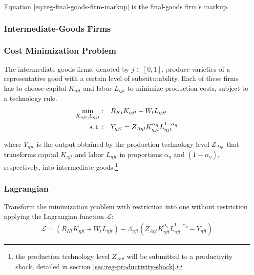 \documentclass[../thesis.tex]{subfiles}
\begin{document}
Equation \ref{eq:reg-final-goods-firm-markup} is the final-goods firm's markup.


\subsubsection{Intermediate-Goods Firms}

\subsubsection*{Cost Minimization Problem}

The intermediate-goods firms, denoted by $j \in [0,1]$, produce varieties of a representative good with a certain level of substitutability. Each of these firms has to choose capital $K_{\eta jt}$ and labor $L_{\eta jt}$ to minimize production costs, subject to a technology rule.
\begin{align}
	\label{eq:reg-int-good-firm-total-cost}
	\min_{K_{\eta jt}, L_{\eta jt}}: \quad & R_{Kt} K_{\eta jt} + W_t L_{\eta jt} \\
	\label{eq:reg-int-good-firm-production-function}
	\operatorname{s.t.}: \quad & Y_{\eta jt} = Z_{A\eta t} K_{\eta jt}^{\alpha_{\eta}} L_{\eta jt}^{1-{\alpha_{\eta}}}
\end{align}

where $Y_{\eta jt}$ is the output obtained by the production technology level $Z_{A\eta t}$ that transforms capital $K_{\eta jt}$ and labor $L_{\eta jt}$ in proportions ${\alpha_{\eta}}$ and $(1-{\alpha_{\eta}})$, respectively, into intermediate goods.\footnote{the production technology level $Z_{A\eta t}$ will be submitted to a productivity shock, detailed in section \ref{sec:reg-productivity-shock}.}

\subsubsection*{Lagrangian}

Transform the minimization problem with restriction into one without restriction applying the Lagrangian function $\mathcal{L}$:
\begin{align}
	\label{eq:reg-int-good-firm-lagrangian}
	\mathcal{L} = (R_{Kt} K_{\eta jt} + W_t L_{\eta jt}) - \Lambda_{\eta jt} (Z_{A\eta t} K_{\eta jt}^{\alpha_{\eta}} L_{\eta jt}^{1-{\alpha_{\eta}}} - Y_{\eta jt})
\end{align}
\end{document}
